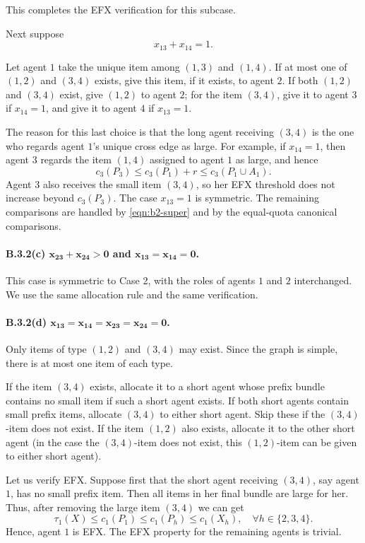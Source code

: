 \documentclass{article}
\theoremstyle{definition}
\begin{document}
This completes the EFX verification for this subcase.

Next suppose
\[
    x_{13}+x_{14}=1.
\]

Let agent $1$ take the unique item among $(1,3)$ and $(1,4)$.  If at most one
of $(1,2)$ and $(3,4)$ exists, give this item, if it exists, to agent $2$.
If both $(1,2)$ and $(3,4)$ exist, give $(1,2)$ to agent $2$; for the item
$(3,4)$, give it to agent $3$ if $x_{14}=1$, and give it to agent $4$ if
$x_{13}=1$.

The reason for this last choice is that the long agent receiving $(3,4)$ is
the one who regards agent $1$'s unique cross edge as large.  For example, if
$x_{14}=1$, then agent $3$ regards the item $(1,4)$ assigned to agent $1$ as
large, and hence
\[
    c_3(P_3)\le c_3(P_1)+r\le c_3(P_1\cup A_1).
\]
Agent $3$ also receives the small item $(3,4)$, so her EFX threshold does not
increase beyond $c_3(P_3)$.  The case $x_{13}=1$ is symmetric.  The remaining
comparisons are handled by \eqref{eqn:b2-super} and by the equal-quota
canonical comparisons.

\paragraph{B.3.2(c) $\boldsymbol{x_{23}+x_{24}>0}$ and $\boldsymbol{x_{13}=x_{14}=0}$.}

This case is symmetric to Case 2, with the roles of agents $1$ and $2$
interchanged.  We use the same allocation rule and the same verification.

\paragraph{B.3.2(d) $\boldsymbol{x_{13}=x_{14}=x_{23}=x_{24}=0}$.}

Only items of type $(1,2)$ and $(3,4)$ may exist.  Since the graph is simple, there is at most one item of each type.

If the item $(3,4)$ exists, allocate it to a short agent whose prefix bundle
contains no small item if such a short agent exists.  If both short agents
contain small prefix items, allocate $(3,4)$ to either short agent.
Skip these if the $(3,4)$-item does not exist.
If the item $(1,2)$ also exists, allocate it to the other short agent (in the case the $(3,4)$-item does not exist, this $(1,2)$-item can be given to either short agent).

Let us verify EFX.  Suppose first that the short agent receiving $(3,4)$,
say agent $1$, has no small prefix item.  Then all items in her final bundle
are large for her.  Thus, after removing
the large item $(3,4)$ we can get
\[
    \tau_1(X)\le c_1(P_1) \le c_1(P_h) \le c_1(X_h), \quad \forall h \in \{2,3,4\}.
\]
Hence, agent $1$ is EFX. The EFX property for the remaining agents is trivial. 
\end{document}
